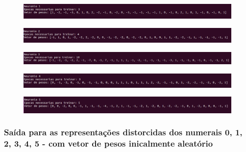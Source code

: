\documentclass[hidelinks,12pt]{article}
\begin{document}
		\begin{figure}[!h]
			\centering
			\includegraphics[scale=0.4]{Figures/E3PE1R.png}
		\end{figure}
		
		\begin{figure}[!h]
			\centering
			\includegraphics[scale=0.4]{Figures/E3PE2R.png}
		\end{figure}
		
		\begin{figure}[!h]
			\centering
			\includegraphics[scale=0.4]{Figures/E3PE3R.png}
		\end{figure}
		
		\begin{figure}[!h]
			\centering
			\includegraphics[scale=0.4]{Figures/E3PE4R.png}
		\end{figure}
		
		\begin{figure}[!h]
			\centering
			\includegraphics[scale=0.4]{Figures/E3PE5R.png}
		\end{figure}
		
		\newpage
		
		\subsubsection{Saída para as representações distorcidas dos numerais 0, 1, 2, 3, 4, 5 - com vetor de pesos inicalmente aleatório}
		
\end{document}
